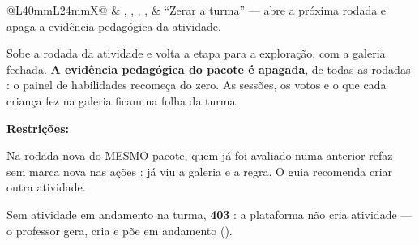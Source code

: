 \begin{tabularx}{\linewidth}{@{}L{40mm}L{24mm}X@{}}
 & , , , ,  & \enquote{Zerar a turma} --- abre a próxima rodada e apaga a evidência pedagógica da atividade.\par Sobe a rodada da atividade e volta a etapa para a exploração, com a galeria fechada. \textbf{A evidência pedagógica do pacote é apagada}, de todas as rodadas : o painel de habilidades recomeça do zero. As sessões, os votos e o que cada criança fez na galeria ficam na folha da turma.\par \textbf{Restrições:}\par \hspace*{1em}\textbullet{} Na rodada nova do MESMO pacote, quem já foi avaliado numa anterior refaz sem marca nova nas ações : já viu a galeria e a regra. O guia recomenda criar outra atividade.\par \hspace*{1em}\textbullet{} Sem atividade em andamento na turma, \textbf{403} : a plataforma não cria atividade --- o professor gera, cria e põe em andamento ().\\

\end{tabularx}
